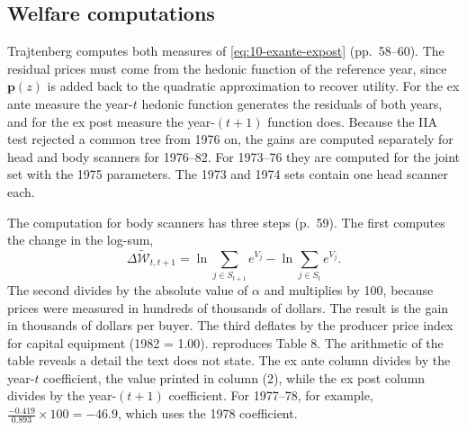 \subsection{Welfare computations}\label{sec:10-ct-welfare}

Trajtenberg computes both measures of \eqref{eq:10-exante-expost} (pp.~58--60). The residual prices must come from
the hedonic function of the reference year, since $\mathbf{p}(z)$ is added back to the quadratic approximation to
recover utility. For the ex ante measure the year-$t$ hedonic function generates the residuals of both years, and
for the ex post measure the year-$(t+1)$ function does. Because the IIA test rejected a common tree from 1976 on,
the gains are computed separately for head and body scanners for 1976--82. For 1973--76 they are computed for the
joint set with the 1975 parameters. The 1973 and 1974 sets contain one head scanner each.

The computation for body scanners has three steps (p.~59). The first computes the change in the log-sum,
\begin{equation}\label{eq:10-traj-dWtilde}
\Delta\widetilde{\mathcal{W}}_{t,t+1} = \ln\sum_{j\in S_{t+1}}e^{V_j} - \ln\sum_{j\in S_t}e^{V_j}.
\end{equation}
The second divides by the absolute value of $\alpha$ and multiplies by 100, because prices were measured in
hundreds of thousands of dollars. The result is the gain in thousands of dollars per buyer. The third deflates by the
producer price index for capital equipment (1982 = 1.00).  reproduces Table 8. The arithmetic of
the table reveals a detail the text does not state. The ex ante column divides by the year-$t$ coefficient, the
value printed in column (2), while the ex post column divides by the year-$(t+1)$ coefficient. For 1977--78, for
example, $\frac{-0.419}{0.893}\times100 = -46.9$, which uses the 1978 coefficient.

